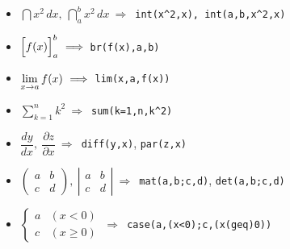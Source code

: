 \documentclass[landscape,10pt]{ujarticle}
\begin{document}
\begin{itemize}
\item
{}$\dint x^2\,dx,\ \dint_a^b x^2\,dx \ \Longrightarrow$\ \verb|int(x^2,x), int(a,b,x^2,x)|\vspace{-2mm}
\item
{}$\Bigl[f(x)\Bigr]_a^b\  \Longrightarrow$\ \verb|br(f(x),a,b)|\vspace{-2mm}
\item
{}$\dlim_{x \to a}f(x) \ \Longrightarrow$\  \verb|lim(x,a,f(x))|\vspace{-2mm}
\item
{}$\displaystyle\sum_{k=1}^{n}k^2 \ \Longrightarrow$\  \verb|sum(k=1,n,k^2)|\vspace{-2mm}
\item
{}$\dfrac{dy}{dx},\ \dfrac{\partial z}{\partial x} \ \Longrightarrow$\ \verb|diff(y,x)|, \verb|par(z,x)|
\item
{}$\begin{pmatrix}a&b\\c&d\end{pmatrix},\ \left|\begin{array}{cc}a&b\\c&d\end{array}\right|
\ \Longrightarrow$\ \verb|mat(a,b;c,d)|, \verb|det(a,b;c,d)|\vspace{-2mm}
\item
{}$\begin{cases}a&(x<0)\\c&(x \geq 0)\end{cases} \ \Longrightarrow$\ \verb|case(a,(x<0);c,(x(geq)0))|\vspace{-2mm}
\end{itemize}



\vspace*{18mm}
\end{document}
